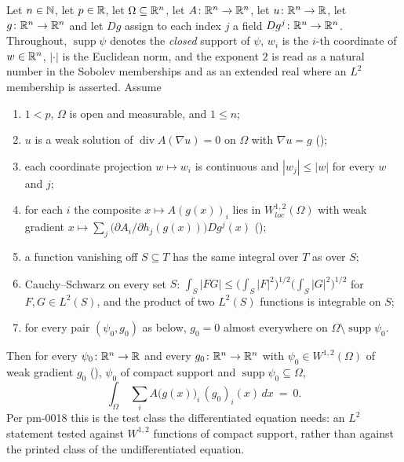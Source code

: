 \begin{helper}
Let $n\in\mathbb{N}$, let $p\in\mathbb{R}$, let $\Omega\subseteq\mathbb{R}^n$, let
$A\colon\mathbb{R}^n\to\mathbb{R}^n$, let $u\colon\mathbb{R}^n\to\mathbb{R}$, let $g\colon\mathbb{R}^n\to\mathbb{R}^n$ and let
$Dg$ assign to each index $j$ a field $Dg^j\colon\mathbb{R}^n\to\mathbb{R}^n$.  Throughout,
$\operatorname{supp}\psi$ denotes the \emph{closed} support of $\psi$, $w_i$ is
the $i$-th coordinate of $w\in\mathbb{R}^n$, $|\cdot|$ is the Euclidean norm, and the
exponent $2$ is read as a natural number in the Sobolev memberships and as an
extended real where an $L^2$ membership is asserted.  Assume
\begin{enumerate}
\item[(H1)] $1<p$, $\Omega$ is open and measurable, and $1\le n$;
\item[(H2)] $u$ is a weak solution of $\operatorname{div}A(\nabla u)=0$ on
  $\Omega$ with $\nabla u=g$ ();
\item[(H3)] each coordinate projection $w\mapsto w_i$ is continuous and
  $|w_j|\le|w|$ for every $w$ and $j$;
\item[(H4)] for each $i$ the composite $x\mapsto A(g(x))_i$ lies in
  $W^{1,2}_{loc}(\Omega)$ with weak gradient
  $x\mapsto\sum_j\bigl(\partial A_i/\partial h_j(g(x))\bigr)Dg^j(x)$
  ();
\item[(H5)] a function vanishing off $S\subseteq T$ has the same integral over
  $T$ as over $S$;
\item[(H6)] Cauchy--Schwarz on every set $S$:
  $\int_S|FG|\le\bigl(\int_S|F|^2\bigr)^{1/2}\bigl(\int_S|G|^2\bigr)^{1/2}$ for
  $F,G\in L^2(S)$, and the product of two $L^2(S)$ functions is integrable on
  $S$;
\item[(H7)] for every pair $(\psi_0,g_0)$ as below, $g_0=0$ almost everywhere
  on $\Omega\setminus\operatorname{supp}\psi_0$.
\end{enumerate}
Then for every $\psi_0\colon\mathbb{R}^n\to\mathbb{R}$ and every $g_0\colon\mathbb{R}^n\to\mathbb{R}^n$ with
$\psi_0\in W^{1,2}(\Omega)$ of weak gradient $g_0$ (),
$\psi_0$ of compact support and $\operatorname{supp}\psi_0\subseteq\Omega$,
\[
\int_\Omega\ \sum_i A\bigl(g(x)\bigr)_i\,(g_0)_i(x)\,dx\ =\ 0 .
\]
Per pm-0018 this is the test class the differentiated equation needs: an $L^2$
statement tested against $W^{1,2}$ functions of compact support, rather than
against the printed class of the undifferentiated equation.
\end{helper}
